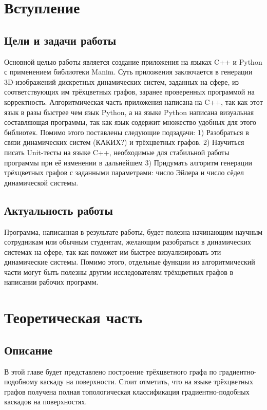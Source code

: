 	\section{Вступление}
	\subsection{Цели и задачи работы}
		Основной целью работы является создание приложения на языках C++ и Python с применением библиотеки Manim. Суть приложения заключается в генерации 3D-изображений дискретных динамических систем, заданных на сфере, из соответствующих им трёхцветных графов, заранее проверенных программой на корректность. Алгоритмическая часть приложения написана на C++, так как этот язык в разы быстрее чем язык Python, а на языке Python написана визуальная составляющая программы, так как язык содержит множество удобных для этого библиотек. Помимо этого поставлены следующие подзадачи:
		1) Разобраться в связи динамических систем (КАКИХ?) и трёхцветных графов.
		2) Научиться писать Unit-тесты на языке C++, необходимые для стабильной работы программы при её изменении в дальнейшем
		3) Придумать алгоритм генерации трёхцветных графов с заданными параметрами: число Эйлера и число сёдел динамической системы.
	\subsection{Актуальность работы}
		Программа, написанная в результате работы, будет полезна начинающим научным сотрудникам или обычным студентам, желающим разобраться в динамических системах на сфере, так как поможет им быстрее визуализировать эти динамические системы. Помимо этого, отдельные функции из алгоритмический части могут быть полезны другим исследователям трёхцветных графов в написании рабочих программ.
	\section{Теоретическая часть}
	\subsection{Описание}
	В этой главе будет представлено построение трёхцветного графа по градиентно-подобному каскаду на поверхности. Стоит отметить, что на языке трёхцветных графов получена полная топологическая классификация градиентно-подобных каскадов на поверхностях.

